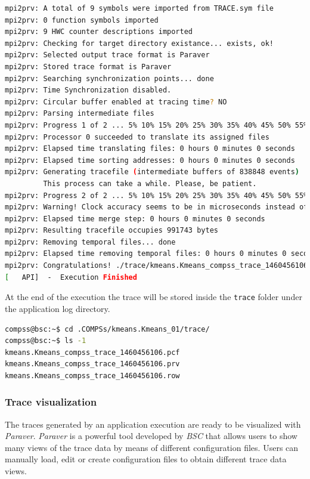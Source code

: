 \begin{lstlisting}[language=bash]
mpi2prv: A total of 9 symbols were imported from TRACE.sym file
mpi2prv: 0 function symbols imported
mpi2prv: 9 HWC counter descriptions imported
mpi2prv: Checking for target directory existance... exists, ok!
mpi2prv: Selected output trace format is Paraver
mpi2prv: Stored trace format is Paraver
mpi2prv: Searching synchronization points... done
mpi2prv: Time Synchronization disabled.
mpi2prv: Circular buffer enabled at tracing time? NO
mpi2prv: Parsing intermediate files
mpi2prv: Progress 1 of 2 ... 5% 10% 15% 20% 25% 30% 35% 40% 45% 50% 55% 60% 65% 70% 75% 80% 85% 90% 95% done
mpi2prv: Processor 0 succeeded to translate its assigned files
mpi2prv: Elapsed time translating files: 0 hours 0 minutes 0 seconds
mpi2prv: Elapsed time sorting addresses: 0 hours 0 minutes 0 seconds
mpi2prv: Generating tracefile (intermediate buffers of 838848 events)
         This process can take a while. Please, be patient.
mpi2prv: Progress 2 of 2 ... 5% 10% 15% 20% 25% 30% 35% 40% 45% 50% 55% 60% 65% 70% 75% 80% 85% 90% 95% done
mpi2prv: Warning! Clock accuracy seems to be in microseconds instead of nanoseconds.
mpi2prv: Elapsed time merge step: 0 hours 0 minutes 0 seconds
mpi2prv: Resulting tracefile occupies 991743 bytes
mpi2prv: Removing temporal files... done
mpi2prv: Elapsed time removing temporal files: 0 hours 0 minutes 0 seconds
mpi2prv: Congratulations! ./trace/kmeans.Kmeans_compss_trace_1460456106.prv has been generated.
[   API]  -  Execution Finished
\end{lstlisting}

At the end of the execution the trace will be stored inside the \texttt{trace} folder under the application log directory.
\begin{lstlisting}[language=bash]
compss@bsc:~$ cd .COMPSs/kmeans.Kmeans_01/trace/
compss@bsc:~$ ls -1
kmeans.Kmeans_compss_trace_1460456106.pcf
kmeans.Kmeans_compss_trace_1460456106.prv
kmeans.Kmeans_compss_trace_1460456106.row
\end{lstlisting}


\subsubsection{Trace visualization}
The traces generated by an application execution are ready to be visualized with \textit{Paraver}. \textit{Paraver} is a powerful 
tool developed by \textit{BSC} that allows users to show many views of the trace data by means of different configuration files.
Users can manually load, edit or create configuration files to obtain different trace data views.

